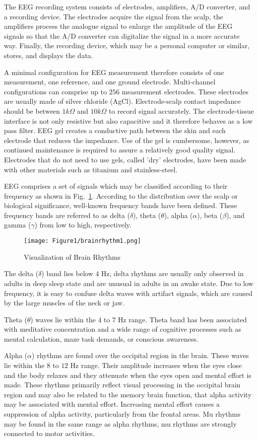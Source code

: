 The EEG recording system consists of electrodes, amplifiers, A/D converter, and a recording device. The electrodes acquire the signal from the scalp, the amplifiers process the analogue signal to enlarge the amplitude of the EEG signals so that the A/D converter can digitalize the signal in a more accurate way. Finally, the recording device, which may be a personal computer or similar, stores, and displays the data.
    
A minimal configuration for EEG measurement therefore consists of one measurement, one reference, and one ground electrode. Multi-channel configurations can comprise up to $256$ measurement electrodes. These electrodes are usually made of silver chloride (AgCl). Electrode-scalp contact impedance should be between $1 k\Omega$ and $10 k\Omega$ to record signal accurately. The electrode-tissue interface is not only resistive but also capacitive and it therefore behaves as a low pass filter. EEG gel creates a conductive path between the skin and each electrode that reduces the impedance. Use of the gel is cumbersome, however, as continued maintenance is required to assure a relatively good quality signal. Electrodes that do not need to use gels, called 'dry' electrodes, have been made with other materials such as titanium and stainless-steel.
 
EEG comprises a set of signals which may be classified according to their frequency as shown in Fig.~\ref{Brhym}. According to the distribution over the scalp or biological significance, well-known frequency bands have been defined. These frequency bands are referred to as delta ($\delta$), theta ($\theta$), alpha ($\alpha$), beta ($\beta$), and gamma ($\gamma$) from low to high, respectively.
\begin{figure}
\centering
\texttt{[image: Figure1/brainrhythm1.png]}
\caption{Visualization of Brain Rhythms}
\label{Brhym}
\end{figure}
The delta ($\delta$) band lies below $4$ Hz, delta rhythms are usually only observed in adults in deep sleep state and are unusual in adults in an awake state. Due to low frequency, it is easy to confuse delta waves with artifact signals, which are caused by the large muscles of the neck or jaw.

Theta ($\theta$) waves lie within the $4$ to $7$ Hz range. Theta band has been associated with meditative concentration and a wide range of cognitive processes such as mental calculation, maze task demands, or conscious awareness.

Alpha ($\alpha$) rhythms are found over the occipital region in the brain. These waves lie within the $8$ to $12$ Hz range. Their amplitude increases when the eyes close and the body relaxes and they attenuate when the eyes open and mental effort is made. These rhythms primarily reflect visual processing in the occipital brain region and may also be related to the memory brain function, that alpha activity may be associated with mental effort. Increasing mental effort causes a suppression of alpha activity, particularly from the frontal areas. Mu rhythms may be found in the same range as alpha rhythms, mu rhythms are strongly connected to motor activities.

